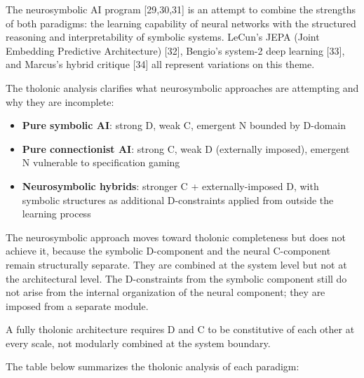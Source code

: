 \documentclass[
  11pt,
  letterpaper,
]{article}
\providecommand{\tightlist}{%
  \setlength{\itemsep}{0pt}\setlength{\parskip}{0pt}}
\begin{document}
The neurosymbolic AI program {[}29,30,31{]} is an attempt to combine the
strengths of both paradigms: the learning capability of neural networks
with the structured reasoning and interpretability of symbolic systems.
LeCun's JEPA (Joint Embedding Predictive Architecture) {[}32{]},
Bengio's system-2 deep learning {[}33{]}, and Marcus's hybrid critique
{[}34{]} all represent variations on this theme.

The tholonic analysis clarifies what neurosymbolic approaches are
attempting and why they are incomplete:

\begin{itemize}
\tightlist
\item
  \textbf{Pure symbolic AI}: strong D, weak C, emergent N bounded by
  D-domain
\item
  \textbf{Pure connectionist AI}: strong C, weak D (externally imposed),
  emergent N vulnerable to specification gaming
\item
  \textbf{Neurosymbolic hybrids}: stronger C + externally-imposed D,
  with symbolic structures as additional D-constraints applied from
  outside the learning process
\end{itemize}

The neurosymbolic approach moves toward tholonic completeness but does
not achieve it, because the symbolic D-component and the neural
C-component remain structurally separate. They are combined at the
system level but not at the architectural level. The D-constraints from
the symbolic component still do not arise from the internal organization
of the neural component; they are imposed from a separate module.

A fully tholonic architecture requires D and C to be constitutive of
each other at every scale, not modularly combined at the system
boundary.

The table below summarizes the tholonic analysis of each paradigm:
\end{document}
